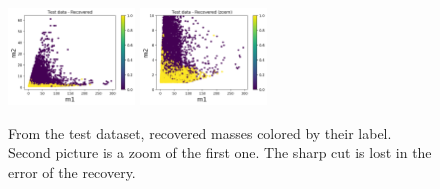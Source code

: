 \documentclass[prd,aps,twocolumn,a4paper,showkeys,nofootinbib]{revtex4-2}
\begin{document}
\begin{figure}[]
  \center
  \includegraphics[width=0.3\textwidth]{./FigNS/label_recovered}
  \includegraphics[width=0.3\textwidth]{./FigNS/label_recovered_1}
  \caption{\label{fig:label_recovered} From the test dataset, recovered masses colored by their label. Second picture is a zoom of the first one. The sharp cut is lost in the error of the recovery.}
\end{figure}
\end{document}
